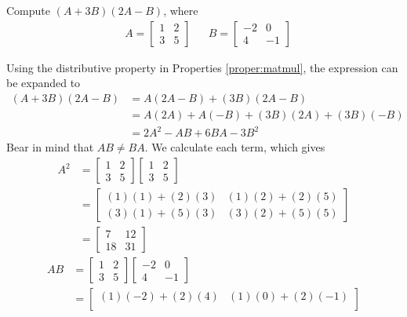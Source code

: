 \begin{exmp}
Compute $(A+3B)(2A-B)$, where
\begin{align*}
& A = 
\begin{bmatrix}
1 & 2 \\
3 & 5 
\end{bmatrix} &
& B = 
\begin{bmatrix}
-2 & 0 \\
4 & -1
\end{bmatrix}
\end{align*}
\end{exmp}
\begin{solution}
Using the distributive property in Properties \ref{proper:matmul}, the expression can be expanded to
\begin{align*}
(A+3B)(2A-B) &= A(2A-B) + (3B)(2A-B)\\
&= A(2A) + A(-B) + (3B)(2A) + (3B)(-B) \\
&= 2A^2 - AB + 6BA - 3B^2
\end{align*}
Bear in mind that $AB \neq BA$. We calculate each term, which gives
\begin{align*}
A^2 &=
\begin{bmatrix}
1 & 2 \\
3 & 5 
\end{bmatrix}
\begin{bmatrix}
1 & 2 \\
3 & 5 
\end{bmatrix} \\
&=
\begin{bmatrix}
(1)(1)+(2)(3) & (1)(2)+(2)(5) \\
(3)(1)+(5)(3) & (3)(2)+(5)(5) 
\end{bmatrix} \\
&=
\begin{bmatrix}
7 & 12 \\
18 & 31 
\end{bmatrix}
\end{align*}
\begin{align*}
AB &= 
\begin{bmatrix}
1 & 2 \\
3 & 5 
\end{bmatrix}
\begin{bmatrix}
-2 & 0 \\
4 & -1
\end{bmatrix} \\
&=
\begin{bmatrix}
(1)(-2)+(2)(4) & (1)(0)+(2)(-1) \\

\end{bmatrix}
\end{align*}
\end{solution}
